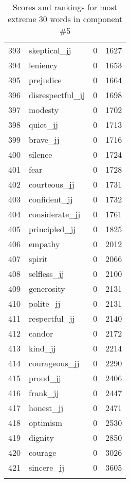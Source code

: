 \begin{longtable}[!htbp]{| rlr@{.}l |}
    393 & skeptical\_jj & 0 & 1627 \\
    394 & leniency & 0 & 1653 \\
    395 & prejudice & 0 & 1664 \\
    396 & disrespectful\_jj & 0 & 1698 \\
    397 & modesty & 0 & 1702 \\
    398 & quiet\_jj & 0 & 1713 \\
    399 & brave\_jj & 0 & 1716 \\
    400 & silence & 0 & 1724 \\
    401 & fear & 0 & 1728 \\
    402 & courteous\_jj & 0 & 1731 \\
    403 & confident\_jj & 0 & 1732 \\
    404 & considerate\_jj & 0 & 1761 \\
    405 & principled\_jj & 0 & 1825 \\
    406 & empathy & 0 & 2012 \\
    407 & spirit & 0 & 2066 \\
    408 & selfless\_jj & 0 & 2100 \\
    409 & generosity & 0 & 2131 \\
    410 & polite\_jj & 0 & 2131 \\
    411 & respectful\_jj & 0 & 2140 \\
    412 & candor & 0 & 2172 \\
    413 & kind\_jj & 0 & 2214 \\
    414 & courageous\_jj & 0 & 2290 \\
    415 & proud\_jj & 0 & 2406 \\
    416 & frank\_jj & 0 & 2447 \\
    417 & honest\_jj & 0 & 2471 \\
    418 & optimism & 0 & 2530 \\
    419 & dignity & 0 & 2850 \\
    420 & courage & 0 & 3026 \\
    421 & sincere\_jj & 0 & 3605 \\
    \hline
    \caption{Scores and rankings for most extreme 30 words in component \#5} \\
\end{longtable}
